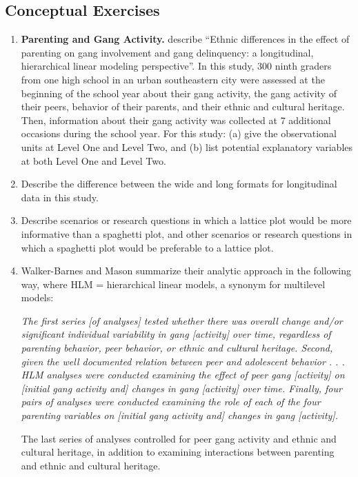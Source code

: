\documentclass[
]{krantz}
\begin{document}
\hypertarget{conceptual-exercises-6}{%
\subsection{Conceptual Exercises}\label{conceptual-exercises-6}}

\begin{enumerate}
\def\labelenumi{\arabic{enumi}.}
\item
  \textbf{Parenting and Gang Activity.} \citet{Walker-Barnes2001} describe ``Ethnic differences in the effect of parenting on gang involvement and gang delinquency: a longitudinal, hierarchical linear modeling perspective''. In this study, 300 ninth graders from one high school in an urban southeastern city were assessed at the beginning of the school year about their gang activity, the gang activity of their peers, behavior of their parents, and their ethnic and cultural heritage. Then, information about their gang activity was collected at 7 additional occasions during the school year. For this study: (a) give the observational units at Level One and Level Two, and (b) list potential explanatory variables at both Level One and Level Two.
\item
  Describe the difference between the wide and long formats for longitudinal data in this study.
\item
  Describe scenarios or research questions in which a lattice plot would be more informative than a spaghetti plot, and other scenarios or research questions in which a spaghetti plot would be preferable to a lattice plot.
\item
  Walker-Barnes and Mason summarize their analytic approach in the following way, where HLM = hierarchical linear models, a synonym for multilevel models:

  \emph{The first series {[}of analyses{]} tested whether there was overall change and/or significant individual variability in gang {[}activity{]} over time, regardless of parenting behavior, peer behavior, or ethnic and cultural heritage. Second, given the well documented relation between peer and adolescent behavior . . . HLM analyses were conducted examining the effect of peer gang {[}activity{]} on {[}initial gang activity and{]} changes in gang {[}activity{]} over time. Finally, four pairs of analyses were conducted examining the role of each of the four parenting variables on {[}initial gang activity and{]} changes in gang {[}activity{]}.}

  The last series of analyses controlled for peer gang activity and ethnic and cultural heritage, in addition to examining interactions between parenting and ethnic and cultural heritage.


\end{enumerate}
\end{document}
